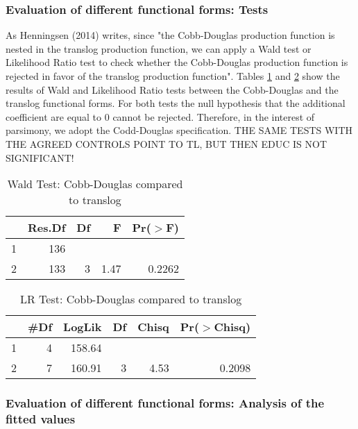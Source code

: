 \documentclass[12pt,a4paper]{article}\usepackage[]{graphicx}\usepackage[]{color}
\begin{document}
\subsubsection{Evaluation of different functional forms: Tests}
As Henningsen (2014) writes, since "the Cobb-Douglas production function is nested in the translog production function, we can apply a Wald test or Likelihood Ratio test to check whether the Cobb-Douglas production function is rejected in favor of the translog production function". Tables \ref{WT} and \ref{LR} show the results of Wald and Likelihood Ratio tests between the Cobb-Douglas and the translog functional forms. For both tests the null hypothesis that the additional coefficient are equal to 0 cannot be rejected. Therefore, in the interest of parsimony, we adopt the Codd-Douglas specification. THE SAME TESTS WITH THE AGREED CONTROLS POINT TO TL, BUT THEN EDUC IS NOT SIGNIFICANT!

\begin{table}[ht]
\centering
\caption{Wald Test: Cobb-Douglas compared to translog} 
\label{WT}
\begin{tabular}{lrrrr}
  \hline
 & Res.Df & Df & F & Pr($>$F) \\ 
  \hline
1 & 136 &  &  &  \\ 
  2 & 133 & 3 & 1.47 & 0.2262 \\ 
   \hline
\end{tabular}
\end{table}
\begin{table}[ht]
\centering
\caption{LR Test: Cobb-Douglas compared to translog} 
\label{LR}
\begin{tabular}{lrrrrr}
  \hline
 & \#Df & LogLik & Df & Chisq & Pr($>$Chisq) \\ 
  \hline
1 & 4 & 158.64 &  &  &  \\ 
  2 & 7 & 160.91 & 3 & 4.53 & 0.2098 \\ 
   \hline
\end{tabular}
\end{table}




\subsubsection{Evaluation of different functional forms: Analysis of the fitted values}
\end{document}
